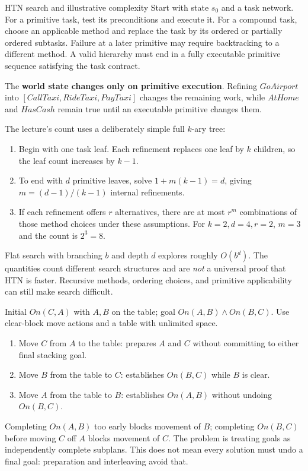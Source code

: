 \documentclass[10pt,a4paper]{article}
\begin{document}
\begin{card}{HTN search and illustrative complexity}
Start with state $s_0$ and a task network. For a primitive task, test its preconditions and execute it. For a compound task, choose an applicable method and replace the task by its ordered or partially ordered subtasks. Failure at a later primitive may require backtracking to a different method. A valid hierarchy must end in a fully executable primitive sequence satisfying the task contract.

The \textbf{world state changes only on primitive execution}. Refining $GoAirport$ into $[CallTaxi,RideTaxi,PayTaxi]$ changes the remaining work, while $AtHome$ and $HasCash$ remain true until an executable primitive changes them.

The lecture's count uses a deliberately simple full $k$-ary tree:
\begin{enumerate}
\item Begin with one task leaf. Each refinement replaces one leaf by $k$ children, so the leaf count increases by $k-1$.
\item To end with $d$ primitive leaves, solve $1+m(k-1)=d$, giving $m=(d-1)/(k-1)$ internal refinements.
\item If each refinement offers $r$ alternatives, there are at most $r^m$ combinations of those method choices under these assumptions. For $k=2,d=4,r=2$, $m=3$ and the count is $2^3=8$.
\end{enumerate}
Flat search with branching $b$ and depth $d$ explores roughly $O(b^d)$. The quantities count different search structures and are \emph{not} a universal proof that HTN is faster. Recursive methods, ordering choices, and primitive applicability can still make search difficult.
\end{card}

\begin{idea}
Initial $On(C,A)$ with $A,B$ on the table; goal $On(A,B)\land On(B,C)$. Use clear-block move actions and a table with unlimited space.
\begin{enumerate}
\item Move $C$ from $A$ to the table: prepares $A$ and $C$ without committing to either final stacking goal.
\item Move $B$ from the table to $C$: establishes $On(B,C)$ while $B$ is clear.
\item Move $A$ from the table to $B$: establishes $On(A,B)$ without undoing $On(B,C)$.
\end{enumerate}
Completing $On(A,B)$ too early blocks movement of $B$; completing $On(B,C)$ before moving $C$ off $A$ blocks movement of $C$. The problem is treating goals as independently complete subplans. This does not mean every solution must undo a final goal: preparation and interleaving avoid that.
\end{idea}
\end{document}
